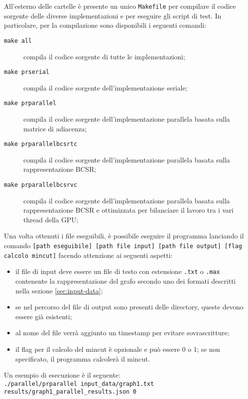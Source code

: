         All'esterno delle cartelle è presente un unico \texttt{Makefile} per compilare il codice sorgente delle diverse implementazioni e per eseguire gli script di test. 
        In particolare, per la compilazione sono disponibili i seguenti comandi:
        \begin{description}
            \item[\texttt{make all}] compila il codice sorgente di tutte le implementazioni;
            \item[\texttt{make prserial}] compila il codice sorgente dell'implementazione seriale;
            \item[\texttt{make prparallel}] compila il codice sorgente dell'implementazione parallela basata sulla matrice di adiacenza;
            \item[\texttt{make prparallelbcsrtc}] compila il codice sorgente dell'implementazione parallela basata sulla rappresentazione BCSR;
            \item[\texttt{make prparallelbcsrvc}] compila il codice sorgente dell'implementazione parallela basata sulla rappresentazione BCSR e ottimizzata per bilanciare il lavoro tra i vari thread della GPU;
        \end{description}

        Una volta ottenuti i file eseguibili, è possibile eseguire il programma lanciando il comando \verb|[path eseguibile] [path file input] [path file output] [flag calcolo mincut]| facendo attenzione ai seguenti aspetti:
        \begin{itemize}
            \item il file di input deve essere un file di testo con estensione \verb|.txt| o \verb|.max| contenente la rappresentazione del grafo secondo uno dei formati descritti nella sezione \ref{sec:input-data};
            \item se nel percorso del file di output sono presenti delle directory, queste devono essere già esistenti;
            \item al nome del file verrà aggiunto un timestamp per evitare sovrascritture;
            \item il flag per il calcolo del mincut è opzionale e può essere 0 o 1; se non specificato, il programma calcolerà il mincut.
        \end{itemize}

        Un esempio di esecuzione è il seguente:\\
        \verb|./parallel/prparallel input_data/graph1.txt results/graph1_parallel_results.json 0|


